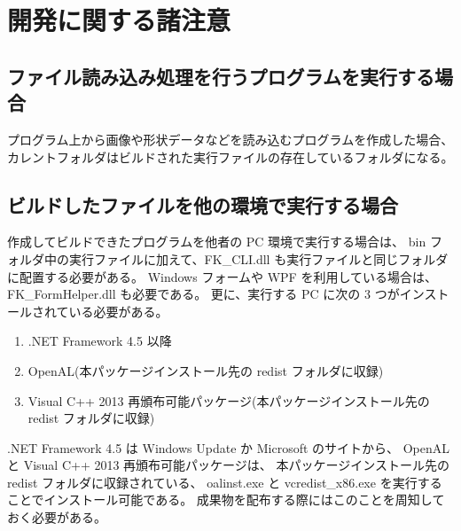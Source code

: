 \documentclass[a4paper]{jsarticle}
\begin{document}
\section{開発に関する諸注意}
\subsection{ファイル読み込み処理を行うプログラムを実行する場合}
プログラム上から画像や形状データなどを読み込むプログラムを作成した場合、
カレントフォルダはビルドされた実行ファイルの存在しているフォルダになる。

\subsection{ビルドしたファイルを他の環境で実行する場合}
作成してビルドできたプログラムを他者の PC 環境で実行する場合は、
bin フォルダ中の実行ファイルに加えて、FK\_CLI.dll も実行ファイルと同じフォルダに配置する必要がある。
Windows フォームや WPF を利用している場合は、FK\_FormHelper.dll も必要である。
更に、実行する PC に次の 3 つがインストールされている必要がある。

\begin{enumerate}
\item .NET Framework 4.5 以降
\item OpenAL(本パッケージインストール先の redist フォルダに収録)
\item Visual C++ 2013 再頒布可能パッケージ(本パッケージインストール先の redist フォルダに収録)
\end{enumerate}

.NET Framework 4.5 は Windows Update か Microsoft のサイトから、
OpenAL と Visual C++ 2013 再頒布可能パッケージは、
本パッケージインストール先の redist フォルダに収録されている、
oalinst.exe と vcredist\_x86.exe を実行することでインストール可能である。
成果物を配布する際にはこのことを周知しておく必要がある。
\end{document}

